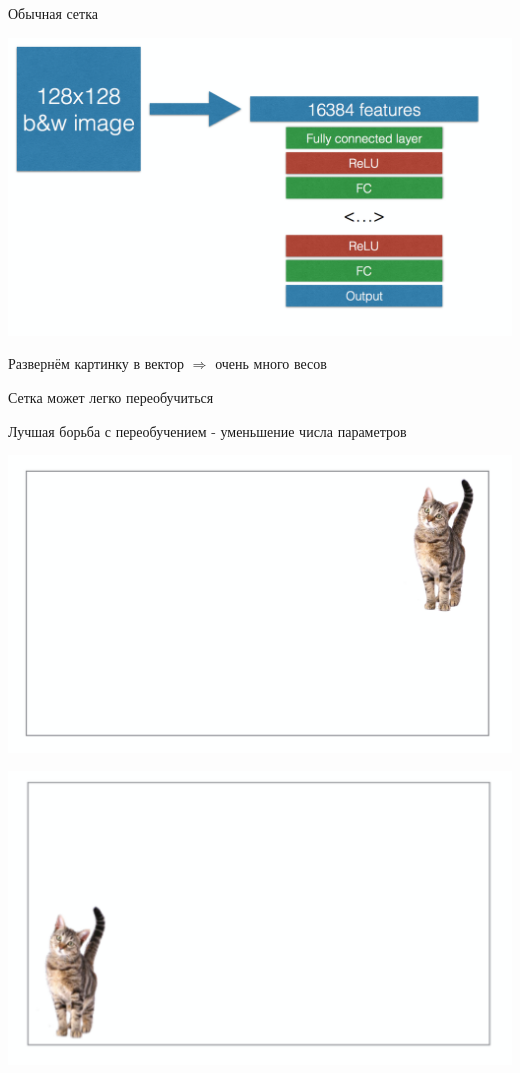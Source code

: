 \documentclass[notes,12pt, aspectratio=169]{beamer}
\newenvironment{wideitemize}{\itemize\addtolength{\itemsep}{10pt}}{\enditemize}
\begin{document}
\begin{frame}{Обычная сетка}
\begin{center}
	\includegraphics[width=.55\linewidth]{not_conv.png}
\end{center}

\begin{wideitemize}
	\item Развернём картинку в вектор $\Rightarrow$  \alert{очень много весов} 
	\item Сетка может легко переобучиться 
	\item Лучшая борьба с переобучением - уменьшение числа параметров
\end{wideitemize}
\end{frame}


\begin{frame}
\begin{center}
	\includegraphics[width=.8\linewidth]{cat_1.png}
\end{center}
\end{frame}


\begin{frame}
\begin{center}
\includegraphics[width=.8\linewidth]{cat_2.png}
\end{center}
\end{frame}
\end{document}
